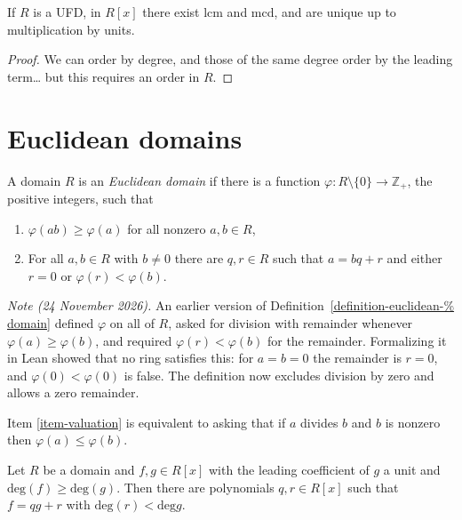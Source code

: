 \begin{lemma}
\label{lemma-existence-of-lcm-%
and-gcd}
If $R$ is a UFD, in $R[x]$ there exist lcm
and mcd, and are unique up to
multiplication by units.
\end{lemma}

\begin{proof}
We can order by degree, and those of the same
degree order by the leading
term… but this requires an order in $R$.
\end{proof}

\section{Euclidean domains}
\label{section-euclidean-%
domains}

\begin{definition}
\label{definition-euclidean-%
domain}
A domain $R$ is an {\it Euclidean domain} if
there
is a function
$\varphi:R\setminus\{0\}\to \mathbb{Z}_+$,
the positive integers,
such that
\begin{enumerate}
\item $\varphi(ab)\geq \varphi(a)$ for all
nonzero $a,b \in R$,
\label{item-valuation}
\item For all $a,b \in R$ with $b\neq 0$
there are $q,r \in R$ such that $a=bq+r$
and either $r=0$
or $\varphi(r)<\varphi(b)$.
\end{enumerate}
\end{definition}

\medskip\noindent
{\it Note (24 November 2026).}
An earlier version of
Definition~\ref{definition-euclidean-%
domain}
defined $\varphi$ on all of $R$,
asked for division with remainder
whenever $\varphi(a)\geq\varphi(b)$,
and required $\varphi(r)<\varphi(b)$
for the remainder.
Formalizing it in Lean showed that
no ring satisfies this:
for $a=b=0$ the remainder is $r=0$,
and $\varphi(0)<\varphi(0)$ is false.
The definition now excludes division
by zero and allows a zero remainder.

\begin{remark}
\label{remark-equivalence-for-%
valuation}
Item
\ref{item-valuation}
is equivalent to
asking that if $a$ divides $b$
and $b$ is nonzero then
$\varphi(a) \leq \varphi (b)$.
\end{remark}

\begin{theorem}
\label{theorem-eucli-algor-%
polyn-rings}
Let $R$ be a domain and $f,g \in R[x]$
with the leading coefficient of $g$ a unit
and $\text{deg}(f)\geq \text{deg}(g)$. Then
there are polynomials $q,r \in R[x]$ such
that
$f=qg+r$ with $\text{deg}(r)<\text{deg}g$.
\end{theorem}


